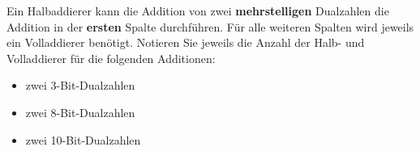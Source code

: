 \begin{exercise}
Ein Halbaddierer kann die Addition von zwei \textbf{mehrstelligen} Dualzahlen die Addition in der \textbf{ersten} Spalte durchführen. Für alle weiteren Spalten wird jeweils ein Volladdierer benötigt. Notieren Sie jeweils die Anzahl der Halb- und Volladdierer für die folgenden Additionen:

\begin{multicols}{3}
\begin{itemize}
\item zwei \num{3}-Bit-Dualzahlen
\item zwei \num{8}-Bit-Dualzahlen
\item zwei \num{10}-Bit-Dualzahlen
\end{itemize}
\end{multicols}
\end{exercise}

